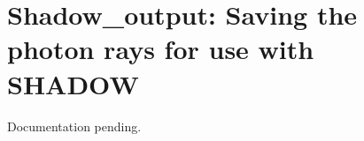 \section{Shadow\_output: Saving the photon rays for use with SHADOW}
\label{s:shadow-output}

Documentation pending.
